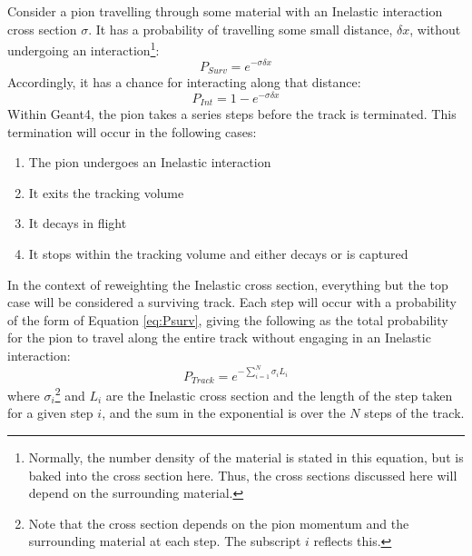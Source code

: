 \documentclass[12pt]{article}
\begin{document}
Consider a pion travelling through some material with an Inelastic interaction cross section $\sigma$. It has a probability of travelling some small distance, $\delta x$, without undergoing an interaction\footnote{Normally, the number density of the material is stated in this equation, but is baked into the cross section here. Thus, the cross sections discussed here will depend on the surrounding material.}:
\begin{equation}\label{eq:Psurv}
P_{Surv} = e^{- \sigma \delta x}
\end{equation}
Accordingly, it has a chance for interacting along that distance:
\begin{equation}\label{eq:Pint}
P_{Int} = 1 - e^{- \sigma \delta x}
\end{equation}
Within Geant4, the pion takes a series steps before the track is terminated. This termination will occur in the following cases:
\begin{enumerate}
\item The pion undergoes an Inelastic interaction
\item It exits the tracking volume
\item It decays in flight
\item It stops within the tracking volume and either decays or is captured
\end{enumerate}
In the context of reweighting the Inelastic cross section, everything but the top case will be considered a surviving track.
Each step will occur with a probability of the form of Equation \ref{eq:Psurv}, giving the following as the total probability for the pion to travel along the entire track without engaging in an Inelastic interaction:
\begin{equation}
P_{Track} =  e^{- \sum \limits_{i = 1}^{N} \sigma_i L_i}
\end{equation} 
where $\sigma_i$\footnote{Note that the cross section depends on the pion momentum and the surrounding material at each step. The subscript $i$ reflects this.} and $L_i$ are the Inelastic cross section and the length of the step taken for a given step $i$, and the sum in the exponential is over the $N$ steps of the track.
\end{document}
